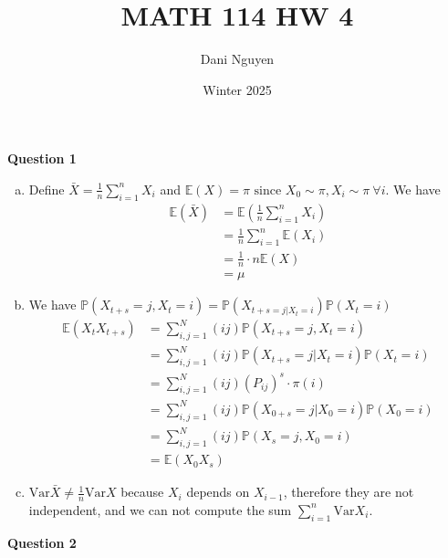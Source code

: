 \documentclass[12pt, letterpaper]{article}
\title{MATH 114 HW 4}
\author{Dani Nguyen}
\date{Winter 2025}
\begin{document}
\maketitle
\graphicspath{ {./} }

\noindent \textbf{Question 1}
\begin{enumerate}[a.]
    \item Define $\bar X = \frac 1n \sum_{i=1}^{n}X_i$ and 
    $\mathbb{E}(X) = \pi \text{ since } X_0 \sim \pi, X_i \sim \pi\ \forall i$. We have
    \begin{align*}
        \mathbb{E}(\bar X) &= \mathbb{E}\left(\frac 1n \sum_{i=1}^{n}X_i\right) \\
        &= \frac 1n \sum_{i=1}^{n}\mathbb{E}(X_i) \\
        &= \frac 1n \cdot n \mathbb{E}(X) \\
        &= \mu
    \end{align*}
    \item We have $\mathbb{P}(X_{t+s} = j, X_t = i)=\mathbb{P}(X_{t+s = j | X_t = i})\mathbb{P}(X_t = i)$
    \begin{align*}
        \mathbb{E}(X_tX_{t+s}) &= \sum_{i,j = 1}^{N} (ij) \mathbb{P}(X_{t+s} = j, X_t = i) \\
        &= \sum_{i,j = 1}^{N} (ij) \mathbb{P}(X_{t+s} = j | X_t = i) \mathbb{P}(X_t =i) \\
        &= \sum_{i,j = 1}^{N} (ij) (P_{ij})^s \cdot \pi(i) \\
        &= \sum_{i,j = 1}^{N} (ij) \mathbb{P}(X_{0+s} = j | X_0 = i) \mathbb{P}(X_0 = i) \\
        &= \sum_{i,j = 1}^{N} (ij) \mathbb{P}(X_s = j, X_0 = i) \\
        &= \mathbb{E}(X_0X_s)
    \end{align*}
    \item $\text{Var}\bar X \ne \frac 1n \text{Var}X$ because $X_i$ depends on $X_{i-1}$, therefore
    they are not independent, and we can not compute the sum $\sum_{i=1}^{n}\text{Var}X_i$.
\end{enumerate}
\newpage
\noindent \textbf{Question 2} \\
\end{document}
